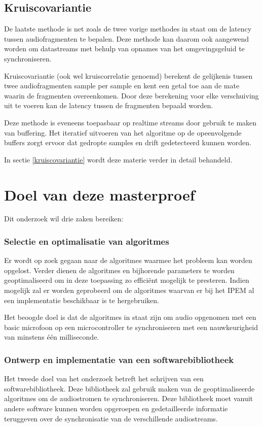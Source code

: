 \subsection{Kruiscovariantie}

De laatste methode is net zoals de twee vorige methodes in staat om de latency tussen audiofragmenten te bepalen. Deze methode kan daarom ook aangewend worden om datastreams met behulp van opnames van het omgevingsgeluid te synchroniseren.

Kruiscovariantie (ook wel kruiscorrelatie genoemd) berekent de gelijkenis tussen twee audiofragmenten sample per sample en kent een getal toe aan de mate waarin de fragmenten overeenkomen. Door deze berekening voor elke verschuiving uit te voeren kan de latency tussen de fragmenten bepaald worden.

Deze methode is eveneens toepasbaar op realtime streams door gebruik te maken van buffering. Het iteratief uitvoeren van het algoritme op de opeenvolgende buffers zorgt ervoor dat gedropte samples en drift gedetecteerd kunnen worden.

In sectie \ref{kruiscovariantie} wordt deze materie verder in detail behandeld.

\section{Doel van deze masterproef}

Dit onderzoek wil drie zaken bereiken: 

\subsubsection{Selectie en optimalisatie van algoritmes}
Er wordt op zoek gegaan naar de algoritmes waarmee het probleem kan worden opgelost. Verder dienen de algoritmes en bijhorende parameters te worden geoptimaliseerd om in deze toepassing zo efficiënt mogelijk te presteren. Indien mogelijk zal er worden geprobeerd om de algoritmes waarvan er bij het IPEM al een implementatie beschikbaar is te hergebruiken.

Het beoogde doel is dat de algoritmes in staat zijn om audio opgenomen met een basic microfoon op een microcontroller te synchroniseren met een nauwkeurigheid van minstens één milliseconde.

\subsubsection{Ontwerp en implementatie van een softwarebibliotheek}
Het tweede doel van het onderzoek betreft het schrijven van een softwarebibliotheek. Deze bibliotheek zal gebruik maken van de geoptimaliseerde algoritmes om de audiostromen te synchroniseren. Deze bibliotheek moet vanuit andere software kunnen worden opgeroepen en gedetailleerde informatie teruggeven over de synchronisatie van de verschillende audiostreams.

